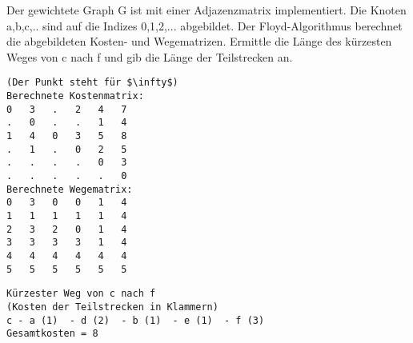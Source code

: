 ﻿\question[4]

Der gewichtete Graph G ist mit einer Adjazenzmatrix implementiert.
Die Knoten a,b,c,.. sind auf die Indizes 0,1,2,... abgebildet.
Der Floyd-Algorithmus berechnet die abgebildeten Kosten- und Wegematrizen.
Ermittle die Länge des kürzesten Weges von c nach f und gib die Länge der Teilstrecken an.
\begin{lstlisting}
(Der Punkt steht für $\infty$)
Berechnete Kostenmatrix:
0   3   .   2   4   7
.   0   .   .   1   4
1   4   0   3   5   8
.   1   .   0   2   5
.   .   .   .   0   3
.   .   .   .   .   0
Berechnete Wegematrix:
0   3   0   0   1   4
1   1   1   1   1   4
2   3   2   0   1   4
3   3   3   3   1   4
4   4   4   4   4   4
5   5   5   5   5   5
\end{lstlisting}

\begin{solutionbox}{4cm}

\begin{lstlisting}
Kürzester Weg von c nach f
(Kosten der Teilstrecken in Klammern)
c - a (1)  - d (2)  - b (1)  - e (1)  - f (3)
Gesamtkosten = 8
\end{lstlisting}
\end{solutionbox}
